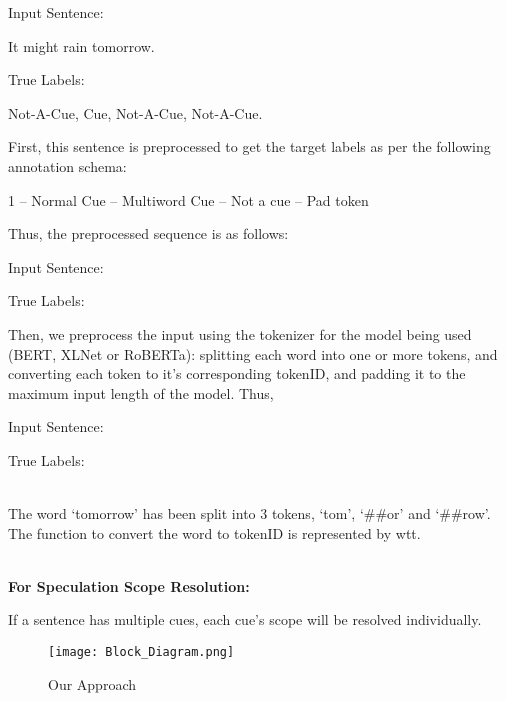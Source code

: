 \documentclass[runningheads]{llncs}
\begin{document}
Input Sentence: \begin{em}It might rain tomorrow.\end{em}

True Labels: \begin{em}Not-A-Cue, Cue, Not-A-Cue, Not-A-Cue.\end{em}

\noindent 
First, this sentence is preprocessed to get the target labels as per the following annotation schema:

    \begin{em}1 – Normal Cue  – Multiword Cue  – Not a cue  – Pad token\end{em}

\noindent 
Thus, the preprocessed sequence is as follows:

Input Sentence: \quad \begin{em}\end{em}

True Labels: \quad \begin{em}[3,1,3,3]\end{em}

\noindent
Then,  we  preprocess  the  input  using the  tokenizer  for  the  model  being  used (BERT, XLNet or RoBERTa): splitting each word into one or more tokens, and converting each token to it’s corresponding tokenID, and padding it to the maximum input length of the model. Thus,

Input Sentence: \quad \begin{em}\end{em}

True Labels: \quad \begin{em}[3,1,3,3,3,3,4,4,4,4,...]\end{em}
\noindent
\\
The word ‘tomorrow' has been split into 3 tokens, ‘tom', ‘\#\#or' and ‘\#\#row'. The function to convert the word to tokenID is represented by wtt.

\noindent
\\
\textbf{For Speculation Scope Resolution:}

\noindent If a sentence has multiple cues, each cue's scope will be resolved individually.

\begin{wrapfigure}{r}{0.38\textwidth}
    \centering
    \texttt{[image: Block\_Diagram.png]}
    \caption{Our Approach}
\end{wrapfigure}
\end{document}
